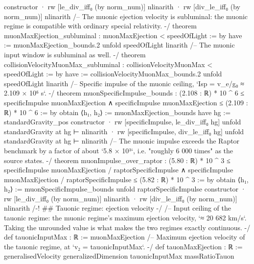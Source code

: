 \documentclass[11pt,a4paper]{article}
\begin{document}
{  constructor
  · rw [le\_\allowbreak{}div\_\allowbreak{}iff₀ (by norm\_\allowbreak{}num)]
    nlinarith
  · rw [div\_\allowbreak{}le\_\allowbreak{}iff₀ (by norm\_\allowbreak{}num)]
    nlinarith
\mbox{}
/-- The muonic ejection velocity is subluminal: the muonic regime is compatible
with ordinary special relativity. -/
theorem muonMaxEjection\_\allowbreak{}subluminal : muonMaxEjection \textless{} speedOfLight := by
  have := muonMaxEjection\_\allowbreak{}bounds.2
  unfold speedOfLight
  linarith
\mbox{}
/-- The muonic input window is subluminal as well. -/
theorem collisionVelocityMuonMax\_\allowbreak{}subluminal : collisionVelocityMuonMax \textless{} speedOfLight := by
  have := collisionVelocityMuonMax\_\allowbreak{}bounds.2
  unfold speedOfLight
  linarith
\mbox{}
/-- Specific impulse of the muonic ceiling, `Isp = v\_\allowbreak{}e/g₀ ≈ 2.109 × 10⁶ s`. -/
theorem muonSpecificImpulse\_\allowbreak{}bounds :
    (2.108 : ℝ) * 10 \textasciicircum{} 6 ≤ specificImpulse muonMaxEjection ∧
      specificImpulse muonMaxEjection ≤ (2.109 : ℝ) * 10 \textasciicircum{} 6 := by
  obtain ⟨h₁, h₂⟩ := muonMaxEjection\_\allowbreak{}bounds
  have hg := standardGravity\_\allowbreak{}pos
  constructor
  · rw [specificImpulse, le\_\allowbreak{}div\_\allowbreak{}iff₀ hg]
    unfold standardGravity at hg ⊢
    nlinarith
  · rw [specificImpulse, div\_\allowbreak{}le\_\allowbreak{}iff₀ hg]
    unfold standardGravity at hg ⊢
    nlinarith
\mbox{}
/-- The muonic impulse exceeds the Raptor benchmark by a factor of about
`5.8 × 10³`, i.e. "roughly 6 000 times" as the source states. -/
theorem muonImpulse\_\allowbreak{}over\_\allowbreak{}raptor :
    (5.80 : ℝ) * 10 \textasciicircum{} 3 ≤ specificImpulse muonMaxEjection / raptorSpecificImpulse ∧
      specificImpulse muonMaxEjection / raptorSpecificImpulse ≤ (5.82 : ℝ) * 10 \textasciicircum{} 3 := by
  obtain ⟨h₁, h₂⟩ := muonSpecificImpulse\_\allowbreak{}bounds
  unfold raptorSpecificImpulse
  constructor
  · rw [le\_\allowbreak{}div\_\allowbreak{}iff₀ (by norm\_\allowbreak{}num)]
    nlinarith
  · rw [div\_\allowbreak{}le\_\allowbreak{}iff₀ (by norm\_\allowbreak{}num)]
    nlinarith
\mbox{}
/-! \#\# Tauonic regime: ejection velocity -/
\mbox{}
/-- Input ceiling of the tauonic regime: the muonic regime's maximum ejection
velocity, `≈ 20 682 km/s`.  Taking the unrounded value is what makes the two
regimes exactly continuous. -/
def tauonicInputMax : ℝ := muonMaxEjection
\mbox{}
/-- Maximum ejection velocity of the tauonic regime, at `v₂ = tauonicInputMax`. -/
def tauonMaxEjection : ℝ :=
  generalisedVelocity generalizedDimension tauonicInputMax massRatioTauon
}
\end{document}
